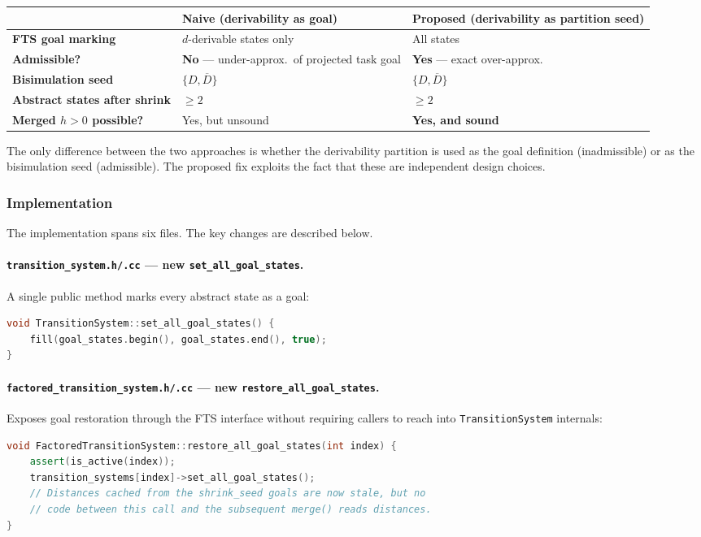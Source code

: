 \documentclass[11pt,a4paper]{article}
\begin{document}
\begin{enumerate}
    \begin{center}
    \begin{tabular}{p{4.5cm} p{4.5cm} p{4.5cm}}
    \toprule
    & \textbf{Naive (derivability as goal)} & \textbf{Proposed (derivability as partition seed)} \\
    \midrule
    \textbf{FTS goal marking} & $d$-derivable states only & All states \\
    \textbf{Admissible?} & \textbf{No} --- under-approx.\ of projected task goal & \textbf{Yes} --- exact over-approx. \\
    \textbf{Bisimulation seed} & $\{D, \overline{D}\}$ & $\{D, \overline{D}\}$ \\
    \textbf{Abstract states after shrink} & $\ge 2$ & $\ge 2$ \\
    \textbf{Merged $h > 0$ possible?} & Yes, but unsound & \textbf{Yes, and sound} \\
    \bottomrule
    \end{tabular}
    \end{center}

    The only difference between the two approaches is whether the derivability
    partition is used as the goal definition (inadmissible) or as the
    bisimulation seed (admissible).  The proposed fix exploits the fact that
    these are independent design choices.

    \subsubsection*{Implementation}

    The implementation spans six files.  The key changes are described below.

    \paragraph{\texttt{transition\_system.h/.cc} --- new \texttt{set\_all\_goal\_states}.}
    A single public method marks every abstract state as a goal:
    \begin{lstlisting}[language=C++]
void TransitionSystem::set_all_goal_states() {
    fill(goal_states.begin(), goal_states.end(), true);
}
    \end{lstlisting}

    \paragraph{\texttt{factored\_transition\_system.h/.cc} --- new \texttt{restore\_all\_goal\_states}.}
    Exposes goal restoration through the FTS interface without requiring
    callers to reach into \texttt{TransitionSystem} internals:
    \begin{lstlisting}[language=C++]
void FactoredTransitionSystem::restore_all_goal_states(int index) {
    assert(is_active(index));
    transition_systems[index]->set_all_goal_states();
    // Distances cached from the shrink_seed goals are now stale, but no
    // code between this call and the subsequent merge() reads distances.
}
    \end{lstlisting}


\end{enumerate}
\end{document}
